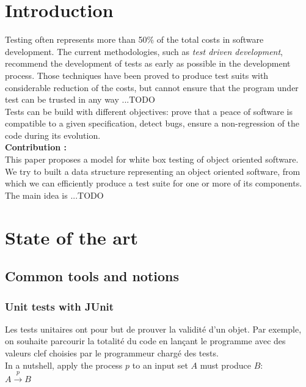 \documentclass[a4paper]{report}
\begin{document}
\chapter*{Introduction}
Testing often represents more than 50\% of the total costs in software development. The current methodologies, such as \textit{test driven development}, recommend the development of tests as early as possible in the development process. Those techniques have been proved to produce test suits with considerable reduction of the costs, but cannot ensure that the program under test can be trusted in any way ...TODO\\
Tests can be build with different objectives: prove that a peace of software is compatible to a given specification, detect bugs, ensure a non-regression of the code during its evolution.\\
\newline
\textbf{Contribution :}\\
This paper proposes a model for white box testing of object oriented software. We try to built a data structure representing an object oriented software, from which we can efficiently produce a test suite for one or more of its components. The main idea is ...TODO





\chapter*{State of the art}


\section*{Common tools and notions}

\subsection*{Unit tests with JUnit}
Les tests unitaires ont pour but de prouver la validité d'un objet. Par exemple, on souhaite parcourir la totalité du code en lançant le programme avec des valeurs clef choisies par le programmeur chargé des tests.\\
In a nutshell, apply the process $p$ to an input set $A$ must produce $B$:\\
$ A \xrightarrow{p} B $\\
\end{document}
